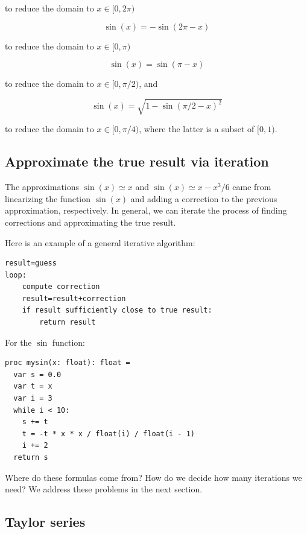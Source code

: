 \documentclass[justified, sixbynine]{tufte-book}
\theoremstyle{plain}%
\newtheorem * {corollary}{Corollary}
\theoremstyle{definition}
\theoremstyle{remark}
\newtheorem * {remark}{Remark}
\newtheorem * {note}{Note}
\begin{document}
\begin{fullwidth}
to reduce the domain to $x \in [0, 2\pi)$

\begin{equation}
\sin(x) = -\sin(2\pi - x)
\end{equation}

to reduce the domain to $x \in [0, \pi)$

\begin{equation}
\sin(x) = \sin(\pi - x)
\end{equation}

to reduce the domain to $x \in [0, \pi/2)$, and

\begin{equation}
\sin(x) = \sqrt{1 - \sin(\pi/2 - x)^2}
\end{equation}

to reduce the domain to $x \in [0, \pi/4)$, where the latter is a subset of $[0, 1)$.

\goodbreak\subsection{Approximate the true result via iteration}


The approximations $\sin(x) \simeq x$ and $\sin(x) \simeq x - x^3/6$ came from linearizing the function $\sin(x)$ and adding a correction to the previous approximation, respectively. In general, we can iterate the process of finding corrections and approximating the true result.

Here is an example of a general iterative algorithm:
\begin{lstlisting}
result=guess
loop:
    compute correction
    result=result+correction
    if result sufficiently close to true result:
        return result
\end{lstlisting}

For the $\sin$ function:

\begin{lstlisting}
proc mysin(x: float): float =
  var s = 0.0
  var t = x
  var i = 3
  while i < 10:
    s += t
    t = -t * x * x / float(i) / float(i - 1)
    i += 2
  return s
\end{lstlisting}

Where do these formulas come from? How do we decide how many iterations we need? We address these problems in the next section.

\goodbreak\subsection{Taylor series}


\end{fullwidth}
\end{document}
